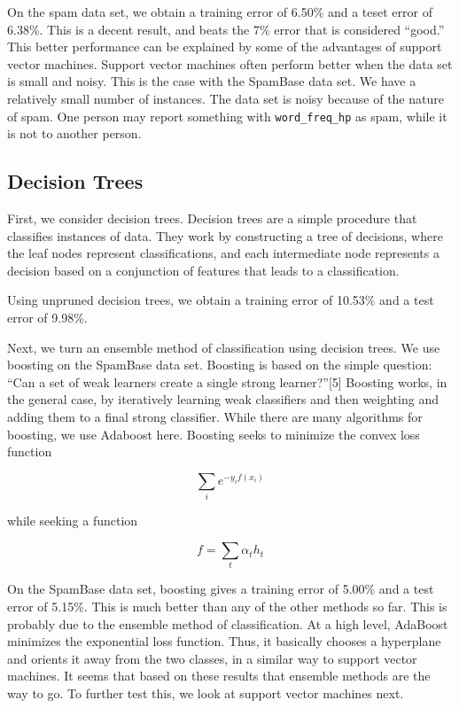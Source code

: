 \documentclass[a4paper,10pt]{article}
\begin{document}
On the spam data set, we obtain a training error of 6.50\% and a teset error of 6.38\%. This is a decent result, and beats
the 7\% error that is considered ``good.'' This better performance can be explained by some of the advantages of support
vector machines. Support vector machines often perform better when the data set is small and noisy. This is the case with
the SpamBase data set. We have a relatively small number of instances. The data set is noisy because of the nature of spam.
One person may report something with \texttt{word\_freq\_hp} as spam, while it is not to another person.


\subsection{Decision Trees}

First, we consider decision trees. Decision trees are a simple procedure that classifies instances of data. They work by
constructing a tree of decisions, where the leaf nodes represent classifications, and each intermediate node represents
a decision based on a conjunction of features that leads to a classification.

Using unpruned decision trees, we obtain a training error of 10.53\% and a test error of 9.98\%.

Next, we turn an ensemble method of classification using decision trees. We use boosting on the SpamBase data set.
Boosting is based on the simple question: ``Can a set of weak learners create a single strong learner?''[5] Boosting
works, in the general case, by iteratively learning weak classifiers and then weighting and adding them to a final strong
classifier. While there are many algorithms for boosting, we use Adaboost here. Boosting seeks to minimize the convex
loss function

$$ \sum_i e^{-y_i f(x_i)} $$

while seeking a function 

$$ f = \sum_t \alpha_t h_t $$

On the SpamBase data set, boosting gives a training error of 5.00\% and a test error of 5.15\%. This is much better
than any of the other methods so far. This is probably due to the ensemble method of classification. At a high level,
AdaBoost minimizes the exponential loss function. Thus, it basically chooses a hyperplane and orients it away from
the two classes, in a similar way to support vector machines. It seems that based on these results that ensemble methods
are the way to go. To further test this, we look at support vector machines next.
\end{document}
